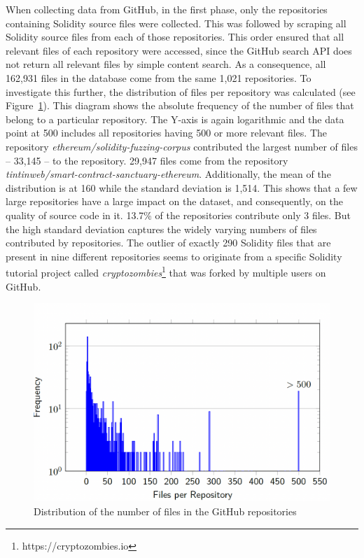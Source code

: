 \documentclass[10pt,conference]{IEEEtran}
\begin{document}
	When collecting data from GitHub, in the first phase, only the repositories containing Solidity source files were collected. This was followed by scraping all Solidity source files from each of those repositories. This order ensured that all relevant files of each repository were accessed, since the GitHub search API does not return all relevant files by simple content search. As a consequence, all 162,931 files in the database come from the same 1,021 repositories. To investigate this further, the distribution of files per repository was calculated (see Figure~\ref{fig:number}). This diagram shows the absolute frequency of the number of files that belong to a particular repository. The Y-axis is again logarithmic and the data point at 500 includes all repositories having 500 or more relevant files. The repository \textit{ethereum/solidity-fuzzing-corpus} contributed the largest number of files -- 33,145 -- to the repository. 29,947 files come from the repository \textit{tintinweb/smart-contract-sanctuary-ethereum}. Additionally, the mean of the distribution is at 160 while the standard deviation is 1,514. This shows that a few large repositories have a large impact on the dataset, and consequently, on the quality of source code in it. 13.7\% of the repositories contribute only 3 files. But the high standard deviation captures the widely varying numbers of files contributed by repositories. The outlier of exactly 290 Solidity files that are present in nine different repositories seems to originate from a specific Solidity tutorial project called \textit{cryptozombies}\footnote{https://cryptozombies.io} that was forked by multiple users on GitHub.
	\begin{figure}[!h]
		\centering
		\includegraphics[scale=0.3]{distr_files_repos.png}
		\caption{Distribution of the number of files in the GitHub repositories}
		\label{fig:number}
	\end{figure}
	
\end{document}
